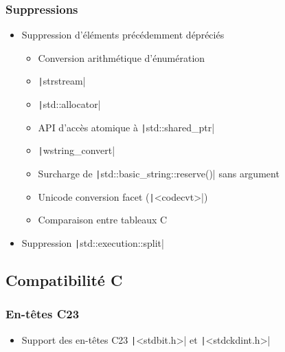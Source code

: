 \documentclass[C++.tex]{subfiles}
\begin{document}
\begin{frame}[fragile]
	\frametitle{Suppressions}
	\begin{itemize}
		\item Suppression d'éléments précédemment dépréciés
		\begin{itemize}
			\item Conversion arithmétique d'énumération
			\item \texttt|strstream|
			\item \texttt|std::allocator|
			\item API d'accès atomique à \texttt|std::shared_ptr|
			\item \texttt|wstring_convert|
			\item Surcharge de \texttt|std::basic_string::reserve()| sans argument
			\item Unicode conversion facet (\texttt|<codecvt>|)
			\item Comparaison entre tableaux C
		\end{itemize}
		\item Suppression \texttt|std::execution::split|
	\end{itemize}

\end{frame}

\subsection*{Compatibilité C}
\begin{frame}[fragile]
	\frametitle{En-têtes C23}
	\begin{itemize}
		\item Support des en-têtes C23 \texttt|<stdbit.h>| et \texttt|<stdckdint.h>|
	\end{itemize}

\end{frame}
\end{document}
